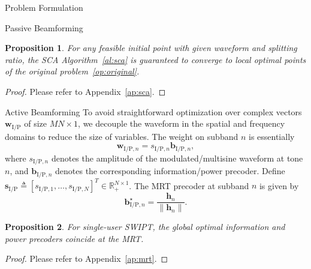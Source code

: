 \documentclass[journal]{IEEEtran}
\newtheorem{proposition}{Proposition}
\begin{document}
\begin{section}{Problem Formulation}
\begin{subsection}{Passive Beamforming}
			\begin{proposition}\label{pr:sca}
				For any feasible initial point with given waveform and splitting ratio, the SCA Algorithm~\ref{al:sca} is guaranteed to converge to local optimal points of the original problem~\eqref{op:original}.
			\end{proposition}

			\begin{proof}\label{pf:sca}
				Please refer to Appendix~\ref{ap:sca}.
			\end{proof}
		\end{subsection}

		\begin{subsection}{Active Beamforming}
			To avoid straightforward optimization over complex vectors $\boldsymbol{w}_{\mathrm{I/P}}$ of size $MN \times 1$, we decouple the waveform in the spatial and frequency domains to reduce the size of variables. The weight on subband $n$ is essentially
			\begin{equation}\label{eq:w}
				\boldsymbol{w}_{\mathrm{I/P}, n} = s_{\mathrm{I/P}, n} \boldsymbol{b}_{\mathrm{I/P}, n},
			\end{equation}
			where $s_{\mathrm{I/P},n}$ denotes the amplitude of the modulated/multisine waveform at tone $n$, and $\boldsymbol{b}_{\mathrm{I/P}, n}$ denotes the corresponding information/power precoder. Define $\boldsymbol{s}_{\mathrm{I/P}} \triangleq [s_{\mathrm{I/P},1},\dots,s_{\mathrm{I/P},N}]^T \in \mathbb{R}_+^{N \times 1}$. The MRT precoder at subband $n$ is given by
			\begin{equation}\label{eq:b_n}
				\boldsymbol{b}_{\mathrm{I/P}, n}^\star = \frac{\boldsymbol{h}_n}{\lVert{\boldsymbol{h}_n}\rVert}.
			\end{equation}

			\begin{proposition}\label{pr:mrt}
				For single-user SWIPT, the global optimal information and power precoders coincide at the MRT.
			\end{proposition}

			\begin{proof}\label{pf:mrt}
				Please refer to Appendix~\ref{ap:mrt}.
			\end{proof}
		\end{subsection}



\end{section}
\end{document}
